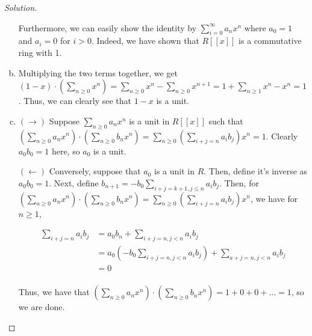 \documentclass[10pt]{article}
\theoremstyle{definition}
\theoremstyle{remark}
\newenvironment{solution}
  {\renewcommand\qedsymbol{$\blacksquare$}\begin{proof}[Solution]}
  {\end{proof}}
\begin{document}
\begin{solution}
\begin{enumerate}[a)]
    Furthermore, we can easily show the identity by $\sum_{i=0}^\infty a_nx^n$ where $a_0 = 1$ and $a_i = 0$ for $i > 0$. Indeed, we have shown that $R[[x]]$ is a commutative ring with 1.
    
    \item Multiplying the two terms together, we get $(1-x) \cdot (\sum_{n \geq 0}x^n) = \sum_{n \geq 0}x^n - \sum_{n \geq 0}x^{n+1} = 1 + \sum_{n \geq 1}x^n - x^n = 1$. Thus, we can clearly see that $1-x$ is a unit.
    
    \item $(\rightarrow)$ Suppose $\sum_{n \geq 0}a_nx^n$ is a unit in $R[[x]]$ such that $(\sum_{n \geq 0} a_nx^n) \cdot (\sum_{n \geq 0} b_nx^n) = \sum_{n \geq 0}(\sum_{i+j = n} a_ib_j) x^n = 1$. Clearly $a_0b_0 = 1$ here, so $a_0$ is a unit. 
    
    $(\leftarrow)$ Conversely, suppose that $a_0$ is a unit in $R$. Then, define it's inverse as $a_0b_0 = 1$. Next, define $b_{n+1} = -b_0 \sum_{i+j=k+1, j \leq n}a_ib_j$. Then, for $(\sum_{n \geq 0} a_nx^n) \cdot (\sum_{n \geq 0} b_nx^n) = \sum_{n \geq 0}(\sum_{i+j = n} a_ib_j) x^n$, we have for $n \geq 1$,
    
    \begin{align*}
        \sum_{i+j=n}a_ib_j &= a_0b_n + \sum_{i+j=n, j<n}a_ib_j \\
                           &= a_0(-b_0 \sum_{i+j=n, j < n}a_ib_j) + \sum_{a+j=n, j<n}a_ib_j \\
                           &= 0 \\
    \end{align*}
    
    Thus, we have that $(\sum_{n \geq 0} a_nx^n) \cdot (\sum_{n \geq 0} b_nx^n) = 1 + 0 + 0 + ... = 1$, so we are done.
    
\end{enumerate}

\end{solution}
\end{document}
